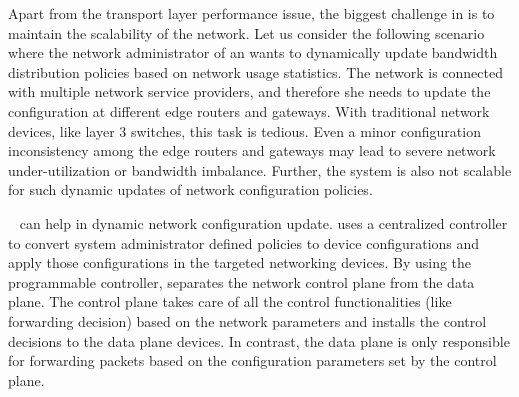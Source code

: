 Apart from the transport layer performance issue, the biggest challenge in  is to maintain the scalability of the network. Let us consider the following scenario where the network administrator of an  wants to dynamically update bandwidth distribution policies based on network usage statistics. The network is connected with multiple network service providers, and therefore she needs to update the configuration at different edge routers and gateways. With traditional network devices, like layer $3$ switches, this task is tedious. Even a minor configuration inconsistency among the edge routers and gateways may lead to severe network under-utilization or bandwidth imbalance. Further, the system is also not scalable for such dynamic updates of network configuration policies.

~\cite{kreutz2015software} can help in dynamic network configuration update.  uses a centralized controller to convert system administrator defined policies to device configurations and apply those configurations in the targeted networking devices. By using the programmable controller,  separates the network control plane from the data plane. The  control plane takes care of all the control functionalities (like forwarding decision) based on the network parameters and installs the control decisions to the data plane devices. In contrast, the data plane is only responsible for forwarding packets based on the configuration parameters set by the control plane. 

